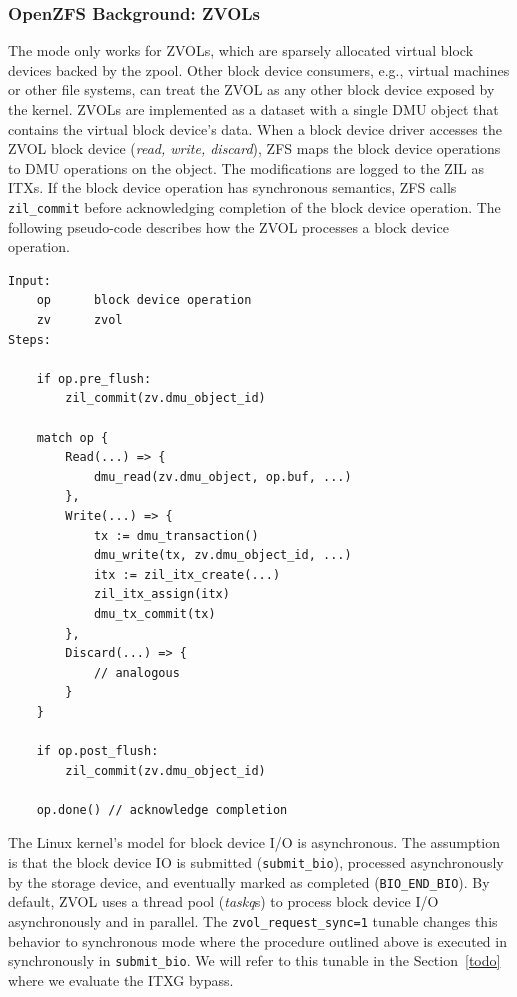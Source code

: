 \documentclass[12pt,a4paper,twoside]{book}
\begin{document}
\subsubsection{OpenZFS Background: ZVOLs}\label{sec:itxgbypass:openzfsbackground_zvols}
The mode only works for ZVOLs, which are sparsely allocated virtual block devices backed by the zpool.
Other block device consumers, e.g., virtual machines or other file systems, can treat the ZVOL as any other block device exposed by the kernel.
ZVOLs are implemented as a dataset with a single DMU object that contains the virtual block device's data.
When a block device driver accesses the ZVOL block device (\textit{read, write, discard}), ZFS maps the block device operations to DMU operations on the object.
The modifications are logged to the ZIL as ITXs.
If the block device operation has synchronous semantics, ZFS calls \lstinline{zil_commit} before acknowledging completion of the block device operation.
The following pseudo-code describes how the ZVOL processes a block device operation.

\begin{lstlisting}[style=figurepseudocode]
Input:
    op      block device operation
    zv      zvol
Steps:

    if op.pre_flush:
        zil_commit(zv.dmu_object_id)

    match op {
        Read(...) => {
            dmu_read(zv.dmu_object, op.buf, ...)
        },
        Write(...) => {
            tx := dmu_transaction()
            dmu_write(tx, zv.dmu_object_id, ...)
            itx := zil_itx_create(...)
            zil_itx_assign(itx)
            dmu_tx_commit(tx)
        },
        Discard(...) => {
            // analogous
        }
    }

    if op.post_flush:
        zil_commit(zv.dmu_object_id)

    op.done() // acknowledge completion

\end{lstlisting}

The Linux kernel's model for block device I/O is asynchronous.
The assumption is that the block device IO is submitted (\lstinline{submit_bio}), processed asynchronously by the storage device, and eventually marked as completed (\lstinline{BIO_END_BIO}).
By default, ZVOL uses a thread pool (\textit{taskq}s) to process block device I/O asynchronously and in parallel.
The \lstinline{zvol_request_sync=1} tunable changes this behavior to synchronous mode where the procedure outlined above is executed in synchronously in \lstinline{submit_bio}.
We will refer to this tunable in the Section~\ref{todo} where we evaluate the ITXG bypass.
\end{document}
